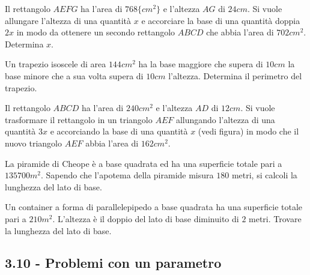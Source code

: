\begin{multicols}{2}
\begin{esercizio}[\Ast]
 \label{ese:3.146}
Il rettangolo $ AEFG $ ha l’area di $ 768\{cm^2\} $ e l’altezza $ AG $ di $ 24\unit{cm} $. Si
vuole allungare l’altezza di una quantità
$ x $ e accorciare la base di una quantità doppia $ 2x $ in modo da ottenere un
secondo rettangolo $ ABCD $ che abbia l’area di $ 702\unit{cm^2} $. Determina $ x $.
\end{esercizio}

\begin{esercizio}
 \label{ese:3.147}
Un trapezio isoscele di area $ 144\unit{cm^2} $ ha la base maggiore che supera di $ 10\unit{cm} $
la base minore che a sua volta supera di $ 10\unit{cm} $ l'altezza. Determina il perimetro del trapezio.
\end{esercizio}

\begin{esercizio}[\Ast]
 \label{ese:3.148}
Il rettangolo $ ABCD $ ha l’area di $ 240\unit{cm^2} $ e l’altezza $ AD $ di $ 12\unit{cm} $. Si
vuole trasformare il rettangolo in un triangolo $ AEF $ allungando l’altezza di una quantità $ 3x $ e accorciando la
base di una quantità $ x $ (vedi figura) in modo che il nuovo triangolo $ AEF $ abbia l’area di $ 162\unit{cm^2} $.
\begin{center}
 
\end{center}
\end{esercizio}

\begin{esercizio}[\Ast]
 \label{ese:3.149}
La piramide di Cheope è a base quadrata ed ha una superficie totale pari a
$ 135700\unit{m^2} $. Sapendo che l’apotema della piramide misura $ 180 $ metri, si
calcoli la lunghezza del lato di base.
\end{esercizio}

\begin{esercizio}[\Ast]
 \label{ese:3.150}
Un container a forma di parallelepipedo a base quadrata ha una superficie
totale pari a $ 210\unit{m^2} $. L’altezza è il doppio del lato di base diminuito di
$ 2 $ metri. Trovare la lunghezza del lato di base.
\end{esercizio}

\subsection*{3.10 - Problemi con un parametro}


\end{multicols}
